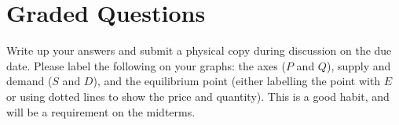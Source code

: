 \documentclass{exam}
\begin{document}


\section{Graded Questions}

Write up your answers and submit a physical copy during discussion on the due date. Please label the following on your graphs: the axes ($P$ and $Q$), supply and demand ($S$ and $D$), and the equilibrium point (either labelling the point with $E$ or using dotted lines to show the price and quantity). This is a good habit, and will be a requirement on the midterms. \\
\end{document}
